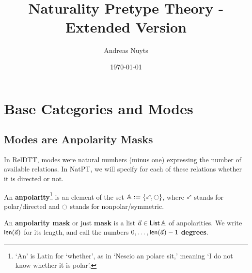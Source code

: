\documentclass[a4paper]{article}
\newcommand{\thetitle}{Naturality Pretype Theory - Extended Version}
\newcommand{\theauthors}{Andreas Nuyts}
\begin{document}
	\addtolength{\voffset}{-.5in}

\title{\thetitle}
\date{\today}
\author{\theauthors{}}
\maketitle

\tableofcontents

\pagebreak

\section{Base Categories and Modes}

\subsection{Modes are Anpolarity Masks}
In RelDTT, modes were natural numbers (minus one) expressing the number of available relations.
In NatPT, we will specify for each of these relations whether it is directed or not.
\begin{definition} \label{def:anpolarity}
	An \textbf{anpolarity}\footnote{`An' is Latin for `whether', as in `Nescio an polare sit,' meaning `I do not know whether it is polar'.} is an element of the set $\Anpolarity := \accol{\ypolar, \npolar}$, where $\ypolar$ stands for polar/directed and $\npolar$ stands for nonpolar/symmetric.
	
	An \textbf{anpolarity mask} or just \textbf{mask} is a list $\vec a \in {\mathsf{List}}\,{\mathbb{A}}$ of anpolarities. We write $\mathsf{len}(\vec a)$ for its length, and call the numbers $0, \ldots, \mathsf{len}(\vec a) - 1$ \textbf{degrees}.
\end{definition}
\end{document}

